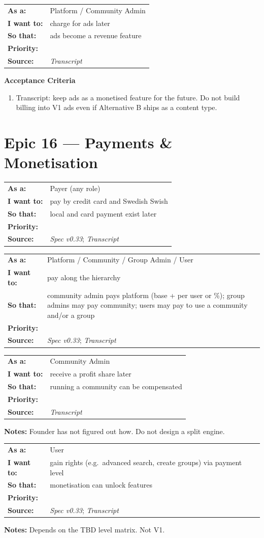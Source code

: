 \documentclass[11pt,a4paper]{article}
\makeatletter
\newcommand{\priPtwo}{\colorbox{p2}{\makebox[4.6em]{\textcolor{white}{\scriptsize\bfseries P2 Later}}}}
\newcommand{\srcSpec}{\textit{Spec v0.33}}
\newcommand{\srcTx}{\textit{Transcript}}
\newenvironment{story}[1]{%
  \Needspace{10\baselineskip}%
  \vspace{0.7em}%
  \noindent
  \colorbox{navy}{\makebox[\dimexpr\textwidth-2\fboxsep\relax][l]{\textcolor{white}{\bfseries\ #1}}}%
  \par\vspace{0.35em}%
}{\par\vspace{0.55em}}
\newcommand{\storymeta}[5]{%
  \noindent
  \begin{tabularx}{\textwidth}{@{}>{\bfseries}l X@{}}
    As a: & #1 \\
    I want to: & #2 \\
    So that: & #3 \\
    Priority: & #4 \\
    Source: & #5 \\
  \end{tabularx}
  \par\vspace{0.3em}
}
\newcommand{\achead}{\noindent\textbf{Acceptance Criteria}\par}
\newcommand{\notes}[1]{\noindent\textbf{Notes:} #1\par}
\makeatother
\begin{document}
\begin{story}{AD-003 --- Monetised advertising later}
\storymeta{Platform / Community Admin}{charge for ads later}{ads become a revenue feature}{\priPtwo}{\srcTx}
\achead
\begin{enumerate}
  \item Transcript: keep ads as a monetised feature for the future. Do not build billing into V1 ads even if Alternative B ships as a content type.
\end{enumerate}
\end{story}

\section{Epic 16 --- Payments \& Monetisation}

\begin{story}{PAY-001 --- Payment methods later}
\storymeta{Payer (any role)}{pay by credit card and Swedish Swish}{local and card payment exist later}{\priPtwo}{\srcSpec; \srcTx}
\end{story}

\begin{story}{PAY-002 --- Multi-level fees later}
\storymeta{Platform / Community / Group Admin / User}{pay along the hierarchy}{community admin pays platform (base + per user or \%); group admins may pay community; users may pay to use a community and/or a group}{\priPtwo}{\srcSpec; \srcTx}
\end{story}

\begin{story}{PAY-003 --- Community admin as payment receiver later}
\storymeta{Community Admin}{receive a profit share later}{running a community can be compensated}{\priPtwo}{\srcTx}
\notes{Founder has not figured out how. Do not design a split engine.}
\end{story}

\begin{story}{PAY-004 --- User levels gated by payment later}
\storymeta{User}{gain rights (e.g.\ advanced search, create groups) via payment level}{monetisation can unlock features}{\priPtwo}{\srcSpec; \srcTx}
\notes{Depends on the TBD level matrix. Not V1.}
\end{story}

\end{document}
